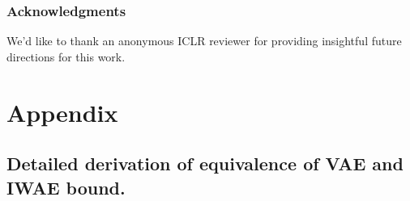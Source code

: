 \documentclass{article} %
\begin{document}















\subsubsection*{Acknowledgments}

We'd like to thank an anonymous ICLR reviewer for providing insightful future directions for this work.





\section{Appendix}




\subsection{Detailed derivation of equivalence of VAE and IWAE bound.}
\label{detailed_derivation}
\end{document}
